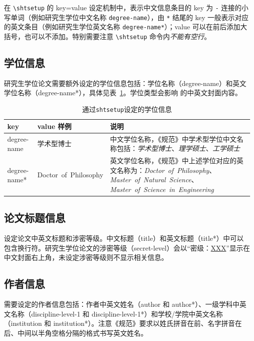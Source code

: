 \documentclass[bachelor, comfort]{shtthesis}
\begin{document}
在 \verb|\shtsetup| 的 key=value 设定机制中，表示中文信息条目的 key 为 \verb|-| 连接的小写单词（例如研究生学位中文名称 \verb|degree-name|），由 \verb|*| 结尾的 key 一般表示对应的英文条目（例如研究生学位英文名称 \verb|degree-name*|）；value 可以在前后添加大括号，也可以不添加。特别需要注意 \verb|\shtsetup| 命令内\emph{不能有空行}。

\subsection{学位信息}
研究生学位论文需要额外设定的学位信息包括：学位名称（degree-name）和英文学位名称（degree-name*），具体见表~\ref{tab::degree_info}。学位类型会影响 \shtthesis{} 的中英文封面内容。
\begin{table}[htb]
\centering
\caption{通过\texttt{shtsetup}设定的学位信息} \label{tab::degree_info}
\begin{tabular}{llp{}}
  \toprule
  key & value 样例 & 说明 \\
  \midrule
  degree-name & 学术型博士 & 中文学位名称，《规范》中学术型学位中文名称包括：\emph{学术型博士}、\emph{理学硕士}、\emph{工学硕士} \\
  degree-name* & Doctor~of~Philosophy & 英文学位名称，《规范》中上述学位对应的英文名称为：\emph{Doctor~of~Philosophy}、\emph{Master~of~Natural~Science}、\emph{Master~of~Science~in~Engineering} \\
  \bottomrule
\end{tabular}
\end{table}

\subsection{论文标题信息}
设定论文中英文标题和涉密等级。中文标题（title）和英文标题（title*）中可以包含换行符。研究生学位论文的涉密等级（secret-level）会以“密级：\uline{XXX}”显示在中文封面右上角，未设定涉密等级则不显示相关信息。

\subsection{作者信息}
需要设定的作者信息包括：作者中英文姓名（author 和 author*）、一级学科中英文名称（discipline-level-1 和 discipline-level-1*）和学校/学院中英文名称（institution 和 institution*）。注意《规范》要求以姓氏拼音在前、名字拼音在后、中间以半角空格分隔的格式书写英文姓名。
\begin{latex}
\end{latex}
\end{document}
